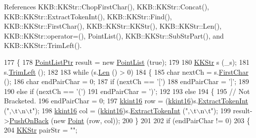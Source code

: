 References K\+K\+B\+::\+K\+K\+Str\+::\+Chop\+First\+Char(), K\+K\+B\+::\+K\+K\+Str\+::\+Concat(), K\+K\+B\+::\+K\+K\+Str\+::\+Extract\+Token\+Int(), K\+K\+B\+::\+K\+K\+Str\+::\+Find(), K\+K\+B\+::\+K\+K\+Str\+::\+First\+Char(), K\+K\+B\+::\+K\+K\+Str\+::\+K\+K\+Str(), K\+K\+B\+::\+K\+K\+Str\+::\+Len(), K\+K\+B\+::\+K\+K\+Str\+::operator=(), Point\+List(), K\+K\+B\+::\+K\+K\+Str\+::\+Sub\+Str\+Part(), and K\+K\+B\+::\+K\+K\+Str\+::\+Trim\+Left().


\begin{DoxyCode}
177 \{
178   \hyperlink{class_k_k_b_1_1_point_list}{PointListPtr}  result = \textcolor{keyword}{new} \hyperlink{class_k_k_b_1_1_point_list_a23bf858f650e6db462382919b02e4fcd}{PointList} (\textcolor{keyword}{true});
179 
180   \hyperlink{class_k_k_b_1_1_k_k_str}{KKStr}  s (\_s);
181   s.\hyperlink{class_k_k_b_1_1_k_k_str_af7c102c53103ddff3f48270b4a198c89}{TrimLeft} ();
182 
183   \textcolor{keywordflow}{while}  (s.\hyperlink{class_k_k_b_1_1_k_k_str_a869142d4855517c5c237afcb25dbbe36}{Len} () > 0)
184   \{
185     \textcolor{keywordtype}{char} nextCh = s.\hyperlink{class_k_k_b_1_1_k_k_str_ac20e69c629b985c6569af914d9cc3e8c}{FirstChar} ();
186     \textcolor{keywordtype}{char} endPairChar = 0;
187     \textcolor{keywordflow}{if}  (nextCh == \textcolor{charliteral}{'['})
188       endPairChar = \textcolor{charliteral}{']'};
189 
190     \textcolor{keywordflow}{else} \textcolor{keywordflow}{if}  (nextCh == \textcolor{charliteral}{'('})
191       endPairChar = \textcolor{charliteral}{')'};
192 
193     \textcolor{keywordflow}{else}
194     \{
195       \textcolor{comment}{// Not Bracketed.}
196       endPairChar = 0;
197       \hyperlink{namespace_k_k_b_a93809780ee294124dda4c23069f41248}{kkint16}  row = (\hyperlink{namespace_k_k_b_a93809780ee294124dda4c23069f41248}{kkint16})s.\hyperlink{class_k_k_b_1_1_k_k_str_ae50047144b908273ffd004bd9379f6d0}{ExtractTokenInt} (\textcolor{stringliteral}{",\(\backslash\)t\(\backslash\)n\(\backslash\)t"});
198       \hyperlink{namespace_k_k_b_a93809780ee294124dda4c23069f41248}{kkint16}  col = (\hyperlink{namespace_k_k_b_a93809780ee294124dda4c23069f41248}{kkint16})s.\hyperlink{class_k_k_b_1_1_k_k_str_ae50047144b908273ffd004bd9379f6d0}{ExtractTokenInt} (\textcolor{stringliteral}{",\(\backslash\)t\(\backslash\)n\(\backslash\)t"});
199       result->\hyperlink{class_k_k_b_1_1_k_k_queue_aa9fba4632b54268bf71ecb42dee0b575}{PushOnBack} (\textcolor{keyword}{new} \hyperlink{class_k_k_b_1_1_point}{Point} (row, col));
200     \}
201 
202     \textcolor{keywordflow}{if}  (endPairChar != 0)
203     \{
204       \hyperlink{class_k_k_b_1_1_k_k_str}{KKStr} pairStr = \textcolor{stringliteral}{""};

\end{DoxyCode}
